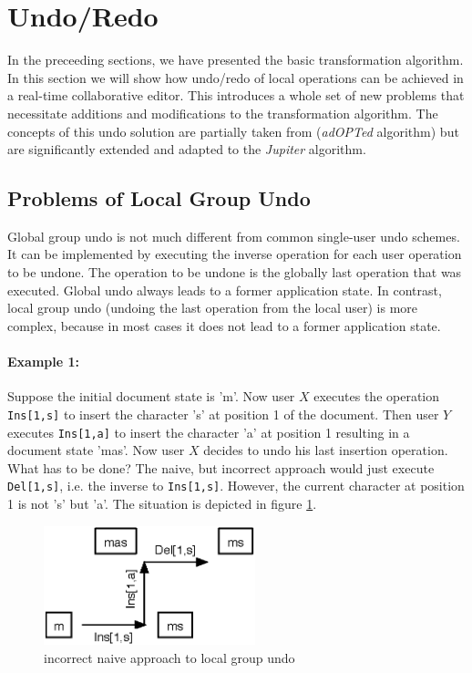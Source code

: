 \section{Undo/Redo}
In the preceeding sections, we have presented the basic transformation algorithm. In this section we will show how undo/redo of local operations can be achieved in a real-time collaborative editor. This introduces a whole set of new problems that necessitate additions and modifications to the transformation algorithm. The concepts of this undo solution are partially taken from \cite{ressel99} (\emph{adOPTed} algorithm) but are significantly extended and adapted to the \emph{Jupiter} algorithm.

\subsection{Problems of Local Group Undo}
Global group undo is not much different from common single-user undo schemes. It can be implemented by executing the inverse operation for each user operation to be undone. The operation to be undone is the globally last operation that was executed. Global undo always leads to a former application state. In contrast, local group undo (undoing the last operation from the local user) is more complex, because in most cases it does not lead to a former application state.

\paragraph{Example 1:} 
\label{example1}
Suppose the initial document state is 'm'. Now user $X$ executes the operation \texttt{Ins[1,s]} to insert the character 's' at position 1 of the document. Then user $Y$ executes \texttt{Ins[1,a]} to insert the character 'a' at position 1 resulting in a document state 'mas'. Now user $X$ decides to undo his last insertion operation. What has to be done? The naive, but incorrect approach would just execute \texttt{Del[1,s]}, i.e. the inverse to \texttt{Ins[1,s]}. However, the current character at position 1 is not 's' but 'a'. The situation is depicted in figure \ref{fig:concepts.naiveundo}.

\begin{figure}[htb]
 \centering
 \includegraphics[width=6.13cm,height=3.45cm]{../../images/concepts_naiveundo.eps}
 \caption{incorrect naive approach to local group undo}
 \label{fig:concepts.naiveundo}
\end{figure}


